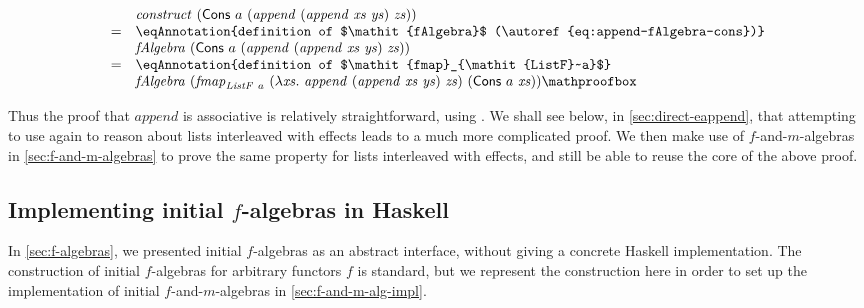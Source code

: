 \begin{proof*}
\begin{displaymath}
\begin{array}{cl}
      & \mathit{construct}~(\mathsf{Cons}~a~(\mathit{append}~(\mathit{append}~\mathit{xs}~\mathit{ys})~\mathit{zs}))\\
      =&\eqAnnotation{definition of $\mathit{fAlgebra}$ (\autoref{eq:append-fAlgebra-cons})} \\
      & \mathit{fAlgebra}~(\mathsf{Cons}~a~(\mathit{append}~(\mathit{append}~\mathit{xs}~\mathit{ys})~\mathit{zs}))\\
      =&\eqAnnotation{definition of $\mathit{fmap}_{\mathit{ListF}~a}$} \\
      & \mathit{fAlgebra}~(\mathit{fmap}_{\mathit{ListF}~a}~(\lambda \mathit{xs}.~\mathit{append}~(\mathit{append}~\mathit{xs}~\mathit{ys})~\mathit{zs})~(\mathsf{Cons}~a~\mathit{xs})) \mathproofbox\\
    \end{array}
  \end{displaymath}
\end{proof*}

Thus the proof that $\mathit{append}$ is associative is relatively
straightforward, using . We shall see
below, in \autoref{sec:direct-eappend}, that attempting to use
 again to reason about lists interleaved
with effects leads to a much more complicated proof. We then make use
of $f$-and-$m$-algebras in \autoref{sec:f-and-m-algebras} to prove the
same property for lists interleaved with effects, and still be able to
reuse the core of the above proof.

\subsection{Implementing initial $f$-algebras in Haskell}
\label{sec:initial-f-alg-impl}


In \autoref{sec:f-algebras}, we presented initial $f$-algebras as an
abstract interface, without giving a concrete Haskell
implementation. The construction of initial $f$-algebras for arbitrary
functors $f$ is standard, but we represent the construction here in
order to set up the implementation of initial $f$-and-$m$-algebras in
\autoref{sec:f-and-m-alg-impl}.

